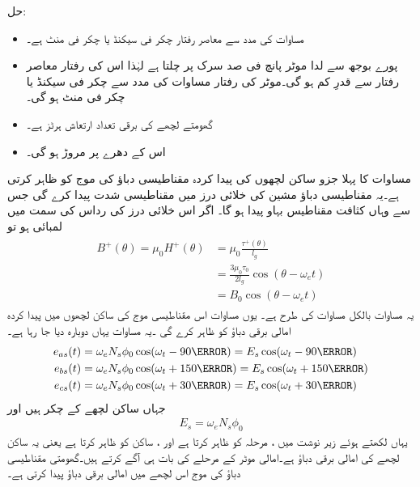 حل:
\begin{itemize}
\item
مساوات   کی مدد سے معاصر رفتار  چکر فی سیکنڈ یا  چکر فی منٹ ہے۔
\item
پورے بوجھ سے لدا موٹر پانچ فی صد سرک پر چلتا ہے لہٰذا اس کی رفتار معاصر رفتار سے قدرِ کم ہو گی۔موٹر کی رفتار مساوات    کی مدد سے  چکر فی سیکنڈ یا  چکر فی منٹ ہو گی۔
\item
گھومتے لچھے کی برقی تعداد ارتعاش  ہرٹز ہے۔
\item
اس کے دھرے پر مروڑ  ہو گی۔
\end{itemize}
%
مساوات   کا پہلا جزو ساکن لچھوں کی پیدا کردہ مقناطیسی دباؤ کی موج  کو ظاہر کرتی ہے۔یہ مقناطیسی دباؤ مشین کی خلائی درز میں مقناطیسی شدت  پیدا کرے گی جس سے وہاں کثافت مقناطیس بہاو  پیدا ہو گا۔ اگر اس خلائی درز کی رداس کی سمت میں لمبائی  ہو تو
\begin{gather}
\begin{aligned}
B^+(\theta)=\mu_0 H^+(\theta)&=\mu_0 \frac{\tau^+(\theta)}{l_g}\\
&=\frac{3 \mu_0 \tau_0}{2 l_g} \cos (\theta-\omega_e t)\\
&=B_0 \cos (\theta-\omega_e t)
\end{aligned}
\end{gather}
یہ مساوات بالکل مساوات   کی طرح ہے۔ یوں مساوات    اس مقناطیسی موج  کی ساکن لچھوں میں پیدا کردہ امالی برقی دباؤ کو ظاہر کرے گی ۔یہ مساوات یہاں دوبارہ دیا جا رہا ہے۔
\begin{gather}
\begin{aligned}\label{مساوات_امالی_تین_دور_سائن_نما_برقی_دباؤ}
e_{as}(t)&=\omega_e N_s \phi_0 \cos (\omega_t -90\degree)=E_s \cos (\omega_t -90\degree)\\
e_{bs}(t)&=\omega_e N_s \phi_0 \cos (\omega_t +150\degree)=E_s \cos (\omega_t +150\degree)\\
e_{cs}(t)&=\omega_e N_s \phi_0 \cos (\omega_t +30\degree)=E_s \cos (\omega_t +30\degree)
\end{aligned}
\end{gather}
جہاں  ساکن لچھے کے چکر ہیں اور
\begin{align}
E_s=\omega_e N_s \phi_0
\end{align}
یہاں   لکھتے ہوئے  زیر نوشت  میں  ، مرحلہ  کو ظاہر کرتا ہے اور ، ساکن کو ظاہر کرتا ہے یعنی یہ ساکن   لچھے کی امالی برقی دباؤ ہے۔امالی موٹر کے   مرحلے  کی بات ہی آگے کرتے ہیں۔گھومتی مقناطیسی دباؤ کی موج اس  لچھے میں امالی برقی دباؤ  پیدا کرتی ہے۔

